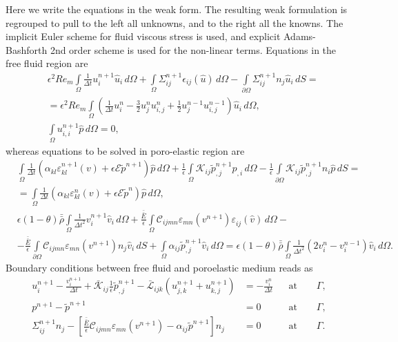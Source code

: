 \documentclass[12pt,a4paper]{article}
\newcommand{\pd}{\partial}
\newcommand{\str}[3]{\varepsilon^{#1}_{#2} \left( #3 \right)}
\newcommand{\ord}{\epsilon}
\begin{document}
Here we write the equations in the weak form. The resulting weak formulation is regrouped to pull to the left all unknowns, and to the right all the knowns. The implicit Euler scheme for fluid viscous stress is used, and explicit Adams-Bashforth 2nd order scheme is used for the non-linear terms. 
Equations in the free fluid region are
\begin{align}
& \ord^2 Re_m \int\limits_{\Omega} \frac{1}{\Delta t} u_i^{n+1} \hat{u}_i \,\mathit{d\Omega} + \int\limits_{\Omega} \Sigma^{n+1}_{ij} \epsilon_{ij} \left( \hat{u} \right)\,\mathit{d\Omega} - \int\limits_{\pd \Omega} \Sigma^{n+1}_{ij} n_{j} \hat{u}_i\,\mathit{dS}  = \\
& = \ord^2 Re_m \int\limits_{\Omega} \left( \frac{1}{\Delta t} u_i^{n} - \frac{3 }{2} u^{n}_j u^{n}_{i,j} + \frac{1}{2} u^{n-1}_j u^{n-1}_{i,j} \right) \hat{u}_i \,\mathit{d\Omega}, \\
& \int\limits_{\Omega}  u^{n+1}_{i,i} \hat{p} \,\mathit{d\Omega} = 0, 
\end{align}
whereas equations to be solved in poro-elastic region are
\begin{align}
& \int\limits_{\Omega} \frac{1}{\Delta t} \left( \alpha_{kl} \str{n+1}{kl}{ v } + \ord \mathcal{E} \tilde{p}^{n+1} \right) \hat{p}\,\mathit{d\Omega} +  \frac{1}{\ord} \int\limits_{\Omega} \mathcal{K}_{ij} \tilde{p}^{n+1}_{,j} \hat{p}_{,i} \,\mathit{d\Omega} -  \frac{1}{\ord} \int\limits_{\pd \Omega} \mathcal{K}_{ij} \tilde{p}^{n+1}_{,j} n_{i} \hat{p} \,\mathit{dS} = \nonumber \\
& = \int\limits_{\Omega} \frac{1}{\Delta t} \left( \alpha_{kl} \str{n}{kl}{ v } + \ord \mathcal{E} \tilde{p}^{n} \right) \hat{p}\,\mathit{d\Omega}, \\
& \ord \left( 1 - \theta \right) \bar{\bar{\rho}} \int\limits_{\Omega} \frac{1}{\Delta t^2} v^{n+1}_i \hat{v}_i \,\mathit{d\Omega} + \frac{\bar{\bar{E}}}{\ord} \int\limits_{\Omega}  \mathcal{C}_{ijmn} \str{}{mn}{v^{n+1}} \str{}{ij}{\hat{v}} \,\mathit{d\Omega} - \\
& - \frac{\bar{\bar{E}}}{\ord} \int\limits_{\pd \Omega}  \mathcal{C}_{ijmn} \str{}{mn}{v^{n+1}} n_j \hat{v}_i \,\mathit{dS} + \int\limits_{\Omega} \alpha_{ij} \tilde{p}^{n+1}_{,j} \hat{v}_i \,\mathit{d\Omega} =  \ord \left( 1 - \theta \right) \bar{\bar{\rho}} \int\limits_{\Omega} \frac{1}{\Delta t^2} \left( 2 v^{n}_i - v^{n-1}_i \right) \hat{v}_i \,\mathit{d\Omega}. \nonumber
\end{align}
Boundary conditions between free fluid and poroelastic medium reads as
\begin{align}
u^{n+1}_i - \frac{v^{n+1}_i}{\Delta t} + \mathcal{\bar{K}}_{ij} \frac{1}{\ord} \tilde{p}^{n+1}_{,j} - \mathcal{\bar{L}}_{ijk} \left( u^{n+1}_{j,k} + u^{n+1}_{k,j} \right) & = - \frac{v^{n}_i}{\Delta t}   & & \textrm{at}\qquad \Gamma, \\
p^{n+1} - \tilde{p}^{n+1} & =  0 & & \textrm{at}\qquad \Gamma, \\
\Sigma_{ij}^{n+1} n_j - \left[ \frac{\bar{\bar{E}}}{\ord} \mathcal{C}_{ijmn} \str{}{mn}{ v^{n+1} } - \alpha_{ij} \tilde{p}^{n+1} \right] n_j & = 0 & & \textrm{at}\qquad \Gamma.
\end{align}
\end{document}
